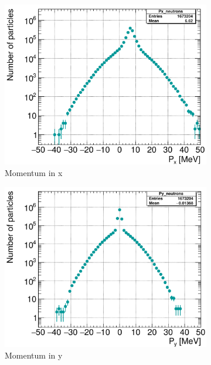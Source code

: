 \begin{figure}[h]
 \centering
  \begin{subfigure}[b]{0.32\textwidth}
   \centering
    \includegraphics[width=\textwidth]{Figures/BeamDump/neutrons_Px.png}
   \caption{Momentum in x}
   \end{subfigure}
   \hfill
   \begin{subfigure}[b]{0.32\textwidth}
   \centering
    \includegraphics[width=\textwidth]{Figures/BeamDump/neutrons_Py.png}
   \caption{Momentum in y}
   \end{subfigure}
   \hfill
    \begin{subfigure}[b]{0.32\textwidth}

\end{subfigure}
\end{figure}
